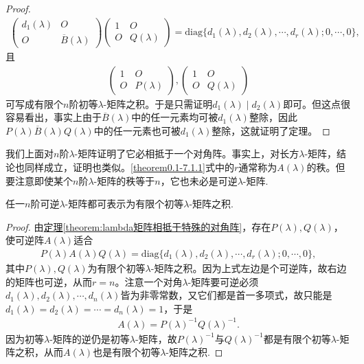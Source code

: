 \documentclass[../../main.tex]{subfiles}%
\begin{document}
\begin{proof}
\begin{align*}
\begin{pmatrix}
d_1(\lambda)&O\\
O&\overline{B}(\lambda)
\end{pmatrix}
\begin{pmatrix}
1&O\\
O&Q(\lambda)
\end{pmatrix}
=\mathrm{diag}\{d_1(\lambda),d_2(\lambda),\cdots,d_r(\lambda);0,\cdots,0\},
\end{align*}
且
\begin{align*}
\begin{pmatrix}
1&O\\
O&P(\lambda)
\end{pmatrix},
\begin{pmatrix}
1&O\\
O&Q(\lambda)
\end{pmatrix}
\end{align*}
可写成有限个$n$阶初等$\lambda$-矩阵之积。于是只需证明$d_1(\lambda)\mid d_2(\lambda)$即可。但这点很容易看出，事实上由于$\overline{B}(\lambda)$中的任一元素均可被$d_1(\lambda)$整除，因此$P(\lambda)\overline{B}(\lambda)Q(\lambda)$中的任一元素也可被$d_1(\lambda)$整除，这就证明了定理。
\end{proof}
\begin{remark}
我们上面对$n$阶$\lambda$-矩阵证明了它必相抵于一个对角阵。事实上，对长方$\lambda$-矩阵，结论也同样成立，证明也类似。\eqref{theorem0.1-7.1.1}式中的$r$通常称为$A(\lambda)$的秩。但要注意即使某个$n$阶$\lambda$-矩阵的秩等于$n$，它也未必是可逆$\lambda$-矩阵.
\end{remark}

\begin{corollary}
任一$n$阶可逆$\lambda$-矩阵都可表示为有限个初等$\lambda$-矩阵之积.
\end{corollary}
\begin{proof}
由\hyperref[theorem:lambda矩阵相抵于特殊的对角阵]{定理\ref{theorem:lambda矩阵相抵于特殊的对角阵}}，存在$P(\lambda),Q(\lambda)$，使可逆阵$A(\lambda)$适合
\begin{align*}
P(\lambda)A(\lambda)Q(\lambda)=\mathrm{diag}\{d_1(\lambda),d_2(\lambda),\cdots,d_r(\lambda);0,\cdots,0\},
\end{align*}
其中$P(\lambda),Q(\lambda)$为有限个初等$\lambda$-矩阵之积。因为上式左边是个可逆阵，故右边的矩阵也可逆，从而$r = n$。注意一个对角$\lambda$-矩阵要可逆必须$d_1(\lambda),d_2(\lambda),\cdots,d_n(\lambda)$皆为非零常数，又它们都是首一多项式，故只能是$d_1(\lambda)=d_2(\lambda)=\cdots=d_n(\lambda)=1$，于是
\begin{align*}
A(\lambda)=P(\lambda)^{-1}Q(\lambda)^{-1}.
\end{align*}
因为初等$\lambda$-矩阵的逆仍是初等$\lambda$-矩阵，故$P(\lambda)^{-1}$与$Q(\lambda)^{-1}$都是有限个初等$\lambda$-矩阵之积，从而$A(\lambda)$也是有限个初等$\lambda$-矩阵之积. 
\end{proof}
\end{document}
